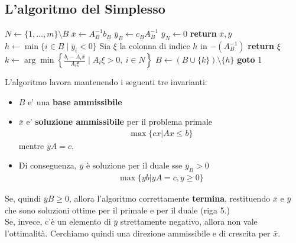 \documentclass[a4paper,12pt]{article}
\begin{document}
\subsection{L'algoritmo del Simplesso}
\begin{algorithm}[H]
\caption{Simplex Primal}
\begin{algorithmic}[1]
\State $N \leftarrow \{1,\ldots,m\} \setminus B$
\State $\bar{x} \leftarrow A_B^{-1} b_B$
\State $\bar{y}_B \leftarrow c_B A_B^{-1}$
\State $\bar{y}_N \leftarrow 0$
    \State \textbf{return} $\bar{x}, \bar{y}$ 
\EndIf
\State $h \leftarrow \min\{ i \in B \mid \bar{y}_i < 0 \}$
\State Sia $\xi$ la colonna di indice $h$ in $-(A_B^{-1})$
    \State \textbf{return} $\xi$ 
\EndIf
\State $k \leftarrow \arg\min \left\{ \frac{b_i - A_i \bar{x}}{A_i \xi} \mid A_i \xi > 0,\ i \in N \right\}$
\State $B \leftarrow (B \cup \{k\}) \setminus \{h\}$
\State \textbf{goto} 1
\end{algorithmic}
\end{algorithm}
L’algoritmo lavora mantenendo i seguenti tre invarianti:
\begin{itemize}
  \item $B$ e' una \textbf{base ammissibile}
  \item $\bar{x}$ e' \textbf{soluzione ammissibile} per il problema primale
  \begin{align*}
    \max \{cx | Ax \leq b\}
  \end{align*}
  mentre $\bar{y} A = c$.
  \item Di conseguenza, $\bar{y}$ è soluzione per il duale sse $\bar{y}_B > 0$
  \begin{align*}
    \max \{yb | yA = c, y \geq 0\}
  \end{align*} 
\end{itemize}
Se, quindi $\bar{y}B \geq 0$, allora l’algoritmo correttamente \textbf{termina}, restituendo $\bar{x}$ e $\bar{y}$ che sono soluzioni ottime per il primale e per il duale (riga 5.)\\
Se, invece, c’è un elemento di $\bar{y}$ strettamente negativo, allora non vale l’ottimalità. Cerchiamo quindi una direzione ammissibile e di crescita per $\bar{x}$.
\end{document}
